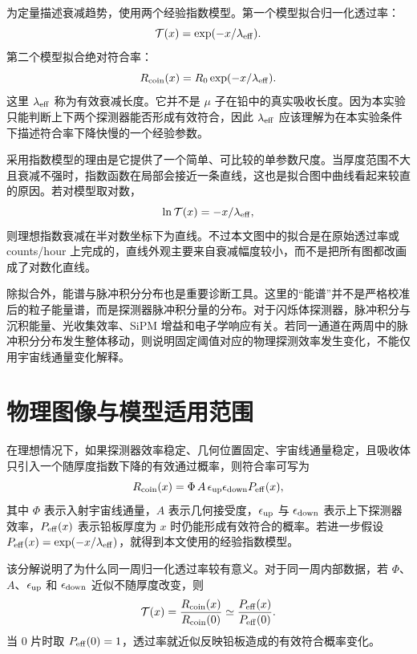 \documentclass[aps,prl,twocolumn,superscriptaddress,nofootinbib]{revtex4-2}
\begin{document}
为定量描述衰减趋势，使用两个经验指数模型。第一个模型拟合归一化透过率：
\begin{equation}
\mathcal{T}(x)=\exp(-x/\lambda_{\rm eff}).
\end{equation}
第二个模型拟合绝对符合率：
\begin{equation}
R_{\rm coin}(x)=R_0\exp(-x/\lambda_{\rm eff}).
\end{equation}
这里 $\lambda_{\rm eff}$ 称为有效衰减长度。它并不是 $\mu$ 子在铅中的真实吸收长度。因为本实验只能判断上下两个探测器能否形成有效符合，因此 \(\lambda_{\rm eff}\) 应该理解为在本实验条件下描述符合率下降快慢的一个经验参数。

采用指数模型的理由是它提供了一个简单、可比较的单参数尺度。当厚度范围不大且衰减不强时，指数函数在局部会接近一条直线，这也是拟合图中曲线看起来较直的原因。若对模型取对数，
\begin{equation}
\ln \mathcal{T}(x)=-x/\lambda_{\rm eff},
\end{equation}
则理想指数衰减在半对数坐标下为直线。不过本文图中的拟合是在原始透过率或 counts/hour 上完成的，直线外观主要来自衰减幅度较小，而不是把所有图都改画成了对数化直线。

除拟合外，能谱与脉冲积分分布也是重要诊断工具。这里的“能谱”并不是严格校准后的粒子能量谱，而是探测器脉冲积分量的分布。对于闪烁体探测器，脉冲积分与沉积能量、光收集效率、SiPM 增益和电子学响应有关。若同一通道在两周中的脉冲积分分布发生整体移动，则说明固定阈值对应的物理探测效率发生变化，不能仅用宇宙线通量变化解释。



\section{物理图像与模型适用范围}

在理想情况下，如果探测器效率稳定、几何位置固定、宇宙线通量稳定，且吸收体只引入一个随厚度指数下降的有效通过概率，则符合率可写为
\begin{equation}
R_{\rm coin}(x)=\Phi\, A\, \epsilon_{\rm up}\epsilon_{\rm down}
P_{\rm eff}(x),
\end{equation}
其中 $\Phi$ 表示入射宇宙线通量，$A$ 表示几何接受度，$\epsilon_{\rm up}$ 与 $\epsilon_{\rm down}$ 表示上下探测器效率，$P_{\rm eff}(x)$ 表示铅板厚度为 $x$ 时仍能形成有效符合的概率。若进一步假设 $P_{\rm eff}(x)=\exp(-x/\lambda_{\rm eff})$，就得到本文使用的经验指数模型。

该分解说明了为什么同一周归一化透过率较有意义。对于同一周内部数据，若 $\Phi$、$A$、$\epsilon_{\rm up}$ 和 $\epsilon_{\rm down}$ 近似不随厚度改变，则
\begin{equation}
\mathcal{T}(x)=\frac{R_{\rm coin}(x)}{R_{\rm coin}(0)}
\simeq \frac{P_{\rm eff}(x)}{P_{\rm eff}(0)} .
\end{equation}
当 0 片时取 $P_{\rm eff}(0)=1$，透过率就近似反映铅板造成的有效符合概率变化。
\end{document}

